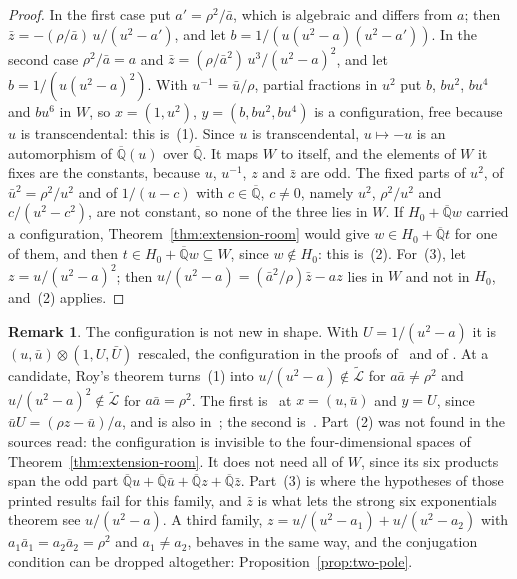\documentclass[11pt,a4paper]{article}
\theoremstyle{plain}
\theoremstyle{definition}
\newtheorem{remark}[theorem]{Remark}
\newcommand{\Alg}{\overline{\mathbb{Q}}}
\newcommand{\aLogs}{\widetilde{\mathcal{L}}}
\begin{document}
\begin{proof}
In the first case put $a'=\rho^{2}/\bar a$, which is algebraic and differs from $a$; then
$\bar z=-(\rho/\bar a)\,u/(u^{2}-a')$, and let $b=1/(u(u^{2}-a)(u^{2}-a'))$. In the second case
$\rho^{2}/\bar a=a$ and $\bar z=(\rho/\bar a^{2})\,u^{3}/(u^{2}-a)^{2}$, and let $b=1/(u(u^{2}-a)^{2})$. With
$u^{-1}=\bar u/\rho$, partial fractions in $u^{2}$ put $b$, $bu^{2}$, $bu^{4}$ and $bu^{6}$ in $W$, so
$x=(1,u^{2})$, $y=(b,bu^{2},bu^{4})$ is a configuration, free because $u$ is transcendental: this is~(1).
Since $u$ is transcendental, $u\mapsto-u$ is an automorphism of $\Alg(u)$ over $\Alg$. It maps $W$ to itself,
and the elements of $W$ it fixes are the constants, because $u$, $u^{-1}$, $z$ and $\bar z$ are odd. The
fixed parts of $u^{2}$, of $\bar u^{2}=\rho^{2}/u^{2}$ and of $1/(u-c)$ with $c\in\Alg$, $c\neq0$, namely
$u^{2}$, $\rho^{2}/u^{2}$ and $c/(u^{2}-c^{2})$, are not constant, so none of the three lies in $W$. If
$H_{0}+\Alg w$ carried a configuration, Theorem~\ref{thm:extension-room} would give $w\in H_{0}+\Alg t$ for one
of them, and then $t\in H_{0}+\Alg w\subseteq W$, since $w\notin H_{0}$: this is~(2). For~(3), let
$z=u/(u^{2}-a)^{2}$; then $u/(u^{2}-a)=(\bar a^{2}/\rho)\bar z-az$ lies in $W$ and not in $H_{0}$, and~(2)
applies.
\end{proof}

\begin{remark}\label{rem:conjugate-pair}
The configuration is not new in shape. With $U=1/(u^{2}-a)$ it is $(u,\bar u)\otimes(1,U,\bar U)$ rescaled,
the configuration in the proofs of~\cite[Th\'eor\`eme~2]{diaz-2004} and of
\cite[Th\'eor\`emes~6(1) and~7(1)]{diaz-2007}. At a candidate, Roy's theorem turns~(1) into
$u/(u^{2}-a)\notin\aLogs$ for $a\bar a\neq\rho^{2}$ and $u/(u^{2}-a)^{2}\notin\aLogs$ for $a\bar a=\rho^{2}$.
The first is~\cite[Th\'eor\`eme~2]{diaz-2004} at $x=(u,\bar u)$ and $y=U$, since $\bar uU=(\rho z-\bar u)/a$,
and is also in~\cite[Corollaire~4(4) and Th\'eor\`eme~7(1)]{diaz-2007}; the second
is~\cite[Th\'eor\`eme~6(3)]{diaz-2007}. Part~(2) was not found in the sources read: the configuration is
invisible to the four-dimensional spaces of Theorem~\ref{thm:extension-room}. It does not need all of $W$,
since its six products span the odd part $\Alg u+\Alg\bar u+\Alg z+\Alg\bar z$. Part~(3) is where the
hypotheses of those printed results fail for this family, and $\bar z$ is what lets the strong six
exponentials theorem see $u/(u^{2}-a)$. A third family, $z=u/(u^{2}-a_{1})+u/(u^{2}-a_{2})$ with
$a_{1}\bar a_{1}=a_{2}\bar a_{2}=\rho^{2}$ and $a_{1}\neq a_{2}$, behaves in the same way, and the conjugation
condition can be dropped altogether: Proposition~\ref{prop:two-pole}.
\end{remark}
\end{document}

